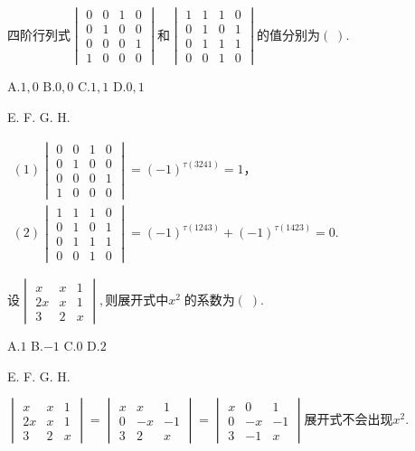 $\mathrm{四阶行列式}\begin{vmatrix}0&0&1&0\\0&1&0&0\\0&0&0&1\\1&0&0&0\end{vmatrix}和\begin{vmatrix}1&1&1&0\\0&1&0&1\\0&1&1&1\\0&0&1&0\end{vmatrix}\mathrm{的值分别为}(\;).$

A.$1,0$   B.$0,0$   C.$1,1$   D.$0,1$

E.   F.   G.   H.

$\begin{array}{l}(1)\begin{vmatrix}0&0&1&0\\0&1&0&0\\0&0&0&1\\1&0&0&0\end{vmatrix}=(-1)^{\tau(3241)}=1，\\(2)\begin{vmatrix}1&1&1&0\\0&1&0&1\\0&1&1&1\\0&0&1&0\end{vmatrix}=(-1)^{\tau(1243)}+(-1)^{\tau(1423)}=0.\end{array}$


$设\begin{vmatrix}x&x&1\\2x&x&1\\3&2&x\end{vmatrix},\mathrm{则展开式中}x^2\;\mathrm{的系数为}(\;).$

A.$1$   B.$-1$   C.$0$   D.$2$

E.   F.   G.   H.

$\begin{vmatrix}x&x&1\\2x&x&1\\3&2&x\end{vmatrix}=\begin{vmatrix}x&x&1\\0&-x&-1\\3&2&x\end{vmatrix}=\begin{vmatrix}x&0&1\\0&-x&-1\\3&-1&x\end{vmatrix}\mathrm{展开式不会出现}x^2.$


